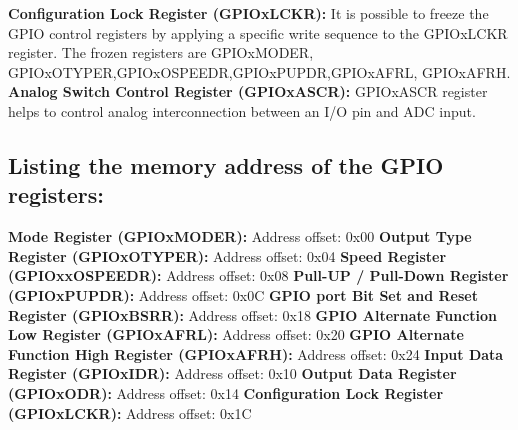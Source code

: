 \documentclass{article}
\begin{document}
\textbf{Configuration Lock Register (GPIOx\textunderscore LCKR): } It is possible to freeze the GPIO control registers by applying a specific write sequence to the GPIOx\textunderscore LCKR register. The frozen registers are GPIOx\textunderscore MODER, GPIOx\textunderscore OTYPER,GPIOx\textunderscore OSPEEDR,GPIOx\textunderscore PUPDR,GPIOx\textunderscore AFRL, GPIOx\textunderscore AFRH.\newline\newline
\textbf{Analog Switch Control Register (GPIOx\textunderscore ASCR): } GPIOx\textunderscore ASCR register helps to control analog interconnection between an I/O pin and ADC input.

\subsection{Listing the memory address of the GPIO registers: }\newline\newline
\textbf{Mode Register (GPIOxMODER): } Address offset: 0x00\newline\newline
\textbf{Output Type Register (GPIOxOTYPER): } Address offset: 0x04\newline\newline
\textbf{Speed  Register  (GPIOxxOSPEEDR): } Address offset: 0x08\newline\newline
\textbf{Pull-UP  /  Pull-Down  Register  (GPIOxPUPDR): } Address offset: 0x0C\newline\newline
\textbf{GPIO port Bit Set and Reset Register (GPIOxBSRR): } Address offset: 0x18\newline\newline
\textbf{GPIO  Alternate  Function  Low  Register  (GPIOxAFRL): } Address offset: 0x20\newline\newline
\textbf{GPIO Alternate Function High Register (GPIOxAFRH): } Address offset: 0x24\newline\newline
\textbf{Input Data Register (GPIOxIDR): } Address offset: 0x10\newline\newline
\textbf{Output Data Register (GPIOxODR): } Address offset: 0x14\newline\newline
\textbf{Configuration Lock Register (GPIOxLCKR): } Address offset: 0x1C\newline\newline
\end{document}
